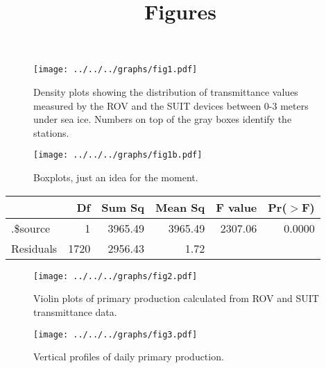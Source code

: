 \documentclass[12pt,a4paper]{scrartcl}
\title{Figures}
\date{}
\begin{document}
\maketitle

\begin{figure}[h]
	\centering
	\texttt{[image: ../../../graphs/fig1.pdf]}
	\caption{Density plots showing the distribution of transmittance values measured by the ROV and the SUIT devices between 0-3 meters under sea ice. Numbers on top of the gray boxes identify the stations.}
\end{figure}

\clearpage
\newpage

\begin{figure}[h]
	\centering
	\texttt{[image: ../../../graphs/fig1b.pdf]}
	\caption{Boxplots, just an idea for the moment.}
\end{figure}

\begin{table}[ht]
    \centering
    \begin{tabular}{lrrrrr}
      \hline
     & Df & Sum Sq & Mean Sq & F value & Pr($>$F) \\ 
      \hline
    .\$source    & 1 & 3965.49 & 3965.49 & 2307.06 & 0.0000 \\ 
      Residuals   & 1720 & 2956.43 & 1.72 &  &  \\ 
       \hline
    \end{tabular}
    \end{table}

    \clearpage
    \newpage

\begin{figure}[h]
\centering
\texttt{[image: ../../../graphs/fig2.pdf]}
\caption{Violin plots of primary production calculated from ROV and SUIT transmittance data.}
\end{figure}

\clearpage
\newpage

\begin{figure}[h]
	\centering
	\texttt{[image: ../../../graphs/fig3.pdf]}
	\caption{Vertical profiles of daily primary production.}
\end{figure}

\clearpage
\newpage
\end{document}
